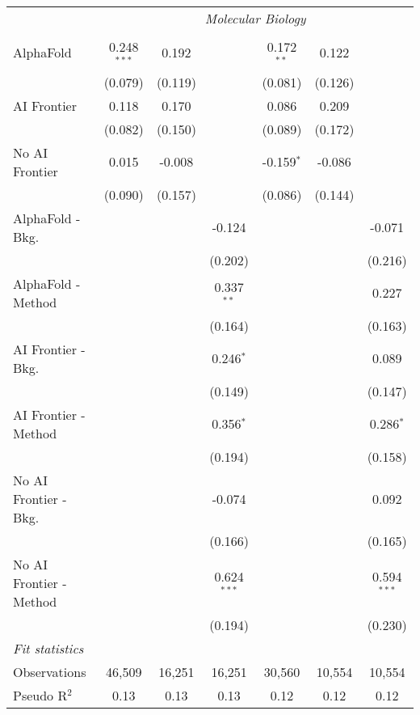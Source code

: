 \begin{tabular}{lcccccc}
 & \multicolumn{6}{c}{\textit{Molecular Biology}} \\ \\
   AlphaFold               & 0.248$^{***}$ & 0.192   &               & 0.172$^{**}$ & 0.122   &   \\   
                           & (0.079)       & (0.119) &               & (0.081)      & (0.126) &   \\   
   AI Frontier             & 0.118         & 0.170   &               & 0.086        & 0.209   &   \\   
                           & (0.082)       & (0.150) &               & (0.089)      & (0.172) &   \\   
   No AI Frontier          & 0.015         & -0.008  &               & -0.159$^{*}$ & -0.086  &   \\   
                           & (0.090)       & (0.157) &               & (0.086)      & (0.144) &   \\   
   AlphaFold - Bkg.        &               &         & -0.124        &              &         & -0.071\\   
                           &               &         & (0.202)       &              &         & (0.216)\\   
   AlphaFold - Method      &               &         & 0.337$^{**}$  &              &         & 0.227\\   
                           &               &         & (0.164)       &              &         & (0.163)\\   
   AI Frontier - Bkg.      &               &         & 0.246$^{*}$   &              &         & 0.089\\   
                           &               &         & (0.149)       &              &         & (0.147)\\   
   AI Frontier - Method    &               &         & 0.356$^{*}$   &              &         & 0.286$^{*}$\\   
                           &               &         & (0.194)       &              &         & (0.158)\\   
   No AI Frontier - Bkg.   &               &         & -0.074        &              &         & 0.092\\   
                           &               &         & (0.166)       &              &         & (0.165)\\   
   No AI Frontier - Method &               &         & 0.624$^{***}$ &              &         & 0.594$^{***}$\\   
                           &               &         & (0.194)       &              &         & (0.230)\\   
   \midrule
   \emph{Fit statistics}\\
   Observations            & 46,509        & 16,251  & 16,251        & 30,560       & 10,554  & 10,554\\  
   Pseudo R$^2$            & 0.13          & 0.13    & 0.13          & 0.12         & 0.12    & 0.12\\  
   

\end{tabular}
